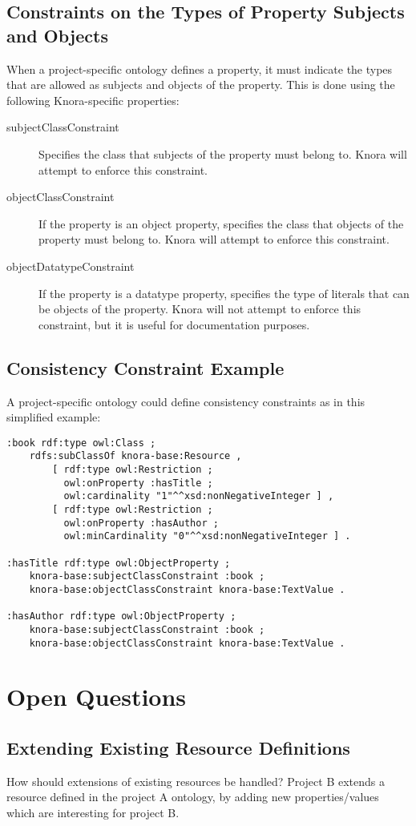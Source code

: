 \documentclass[12pt, a4paper]{article}
\begin{document}
\subsection{Constraints on the Types of Property Subjects and Objects}

\label{subsec:property-restrictions}

When a project-specific ontology defines a property, it must indicate the types that are allowed as subjects and objects of the property. This is done using the following Knora-specific properties:

\begin{description}
	\item[subjectClassConstraint] Specifies the class that subjects of the property must belong to. Knora will attempt to enforce this constraint.
	\item[objectClassConstraint] If the property is an object property, specifies the class that objects of the property must belong to. Knora will attempt to enforce this constraint.
	\item[objectDatatypeConstraint] If the property is a datatype property, specifies the type of literals that can be objects of the property. Knora will not attempt to enforce this constraint, but it is useful for documentation purposes.
\end{description}

\subsection{Consistency Constraint Example}

A project-specific ontology could define consistency constraints as in this simplified example:

\begin{verbatim}
:book rdf:type owl:Class ;
    rdfs:subClassOf knora-base:Resource ,
        [ rdf:type owl:Restriction ;
          owl:onProperty :hasTitle ;
          owl:cardinality "1"^^xsd:nonNegativeInteger ] ,
        [ rdf:type owl:Restriction ;
          owl:onProperty :hasAuthor ;
          owl:minCardinality "0"^^xsd:nonNegativeInteger ] .

:hasTitle rdf:type owl:ObjectProperty ;
    knora-base:subjectClassConstraint :book ;
    knora-base:objectClassConstraint knora-base:TextValue .

:hasAuthor rdf:type owl:ObjectProperty ;
    knora-base:subjectClassConstraint :book ;
    knora-base:objectClassConstraint knora-base:TextValue .
\end{verbatim}

\section{Open Questions}

\subsection{Extending Existing Resource Definitions}

How should extensions of existing resources be handled? Project B extends a resource defined in the project A ontology, by adding new properties/values which are interesting for project B.

\printbibliography
\end{document}
